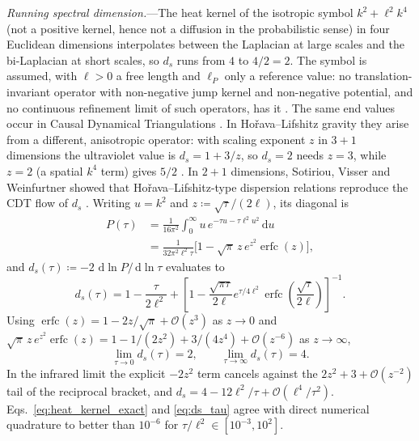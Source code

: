 \documentclass[aps,prl,reprint,twocolumn,superscriptaddress,nofootinbib,floatfix]{revtex4-2}
\newcommand{\dif}{\,\mathrm{d}}
\begin{document}
\emph{Running spectral dimension.}---The heat kernel of the isotropic symbol $k^2 + \ell^2 k^4$ (not a positive kernel, hence not a diffusion in the probabilistic sense) in four Euclidean dimensions interpolates between the Laplacian at large scales and the bi-Laplacian at short scales, so $d_s$ runs from $4$ to $4/2 = 2$. The symbol is assumed, with $\ell > 0$ a free length and $\ell_P$ only a reference value: no translation-invariant operator with non-negative jump kernel and non-negative potential, and no continuous refinement limit of such operators, has it \cite{silvafilho2026grand}. The same end values occur in Causal Dynamical Triangulations \cite{ambjorn2005spectral}. In Ho\v{r}ava--Lifshitz gravity they arise from a different, anisotropic operator: with scaling exponent $z$ in $3+1$ dimensions the ultraviolet value is $d_s = 1 + 3/z$, so $d_s = 2$ needs $z = 3$, while $z = 2$ (a spatial $k^4$ term) gives $5/2$ \cite{horava2009spectral}. In $2+1$ dimensions, Sotiriou, Visser and Weinfurtner showed that Ho\v{r}ava--Lifshitz-type dispersion relations reproduce the CDT flow of $d_s$ \cite{sotiriou2011spectral}. Writing $u = k^2$ and $z \coloneqq \sqrt{\tau}/(2\ell)$, its diagonal is
\begin{align}
    \label{eq:heat_kernel_exact}
    P(\tau) &= \frac{1}{16\pi^2} \int_0^\infty u\, e^{-\tau u - \tau \ell^2 u^2} \dif u \nonumber \\
    &= \frac{1}{32\pi^2 \ell^2 \tau} \Big[ 1 - \sqrt{\pi}\, z\, e^{z^2} \operatorname{erfc}(z) \Big],
\end{align}
and $d_s(\tau) \coloneqq -2\, \dif \ln P / \dif \ln \tau$ evaluates to
\begin{equation}
    \label{eq:ds_tau}
    d_s(\tau) = 1 - \frac{\tau}{2\ell^2} + \left[ 1 - \frac{\sqrt{\pi \tau}}{2\ell} e^{\tau/4\ell^2} \operatorname{erfc}\!\left( \frac{\sqrt{\tau}}{2\ell} \right) \right]^{-1}.
\end{equation}
Using $\operatorname{erfc}(z) = 1 - 2z/\sqrt{\pi} + \mathcal{O}(z^3)$ as $z \to 0$ and $\sqrt{\pi}\, z\, e^{z^2} \operatorname{erfc}(z) = 1 - 1/(2z^2) + 3/(4z^4) + \mathcal{O}(z^{-6})$ as $z \to \infty$,
\begin{equation}
    \label{eq:ds_limits}
    \lim_{\tau \to 0} d_s(\tau) = 2, \qquad \lim_{\tau \to \infty} d_s(\tau) = 4.
\end{equation}
In the infrared limit the explicit $-2z^2$ term cancels against the $2z^2 + 3 + \mathcal{O}(z^{-2})$ tail of the reciprocal bracket, and $d_s = 4 - 12\ell^2/\tau + \mathcal{O}(\ell^4/\tau^2)$. Eqs.~\eqref{eq:heat_kernel_exact} and \eqref{eq:ds_tau} agree with direct numerical quadrature to better than $10^{-6}$ for $\tau/\ell^2 \in [10^{-3}, 10^2]$.
\end{document}
